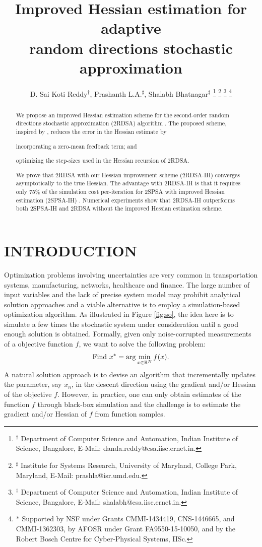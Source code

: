 \documentclass[letterpaper, 10 pt, conference]{ieeeconf}  %
\title{\LARGE \bf
Improved Hessian estimation for adaptive \\random directions stochastic approximation
}
\author{D. Sai Koti Reddy$^\dagger$, Prashanth L.A.$^\sharp$, Shalabh Bhatnagar$^\ddag$
\thanks{
$^\dagger$ Department of Computer Science and Automation,
Indian Institute of Science, Bangalore,
E-Mail: danda.reddy@csa.iisc.ernet.in.}
\thanks{$^\sharp$ Institute for Systems Research, University of Maryland, College Park, Maryland,
E-Mail: prashla@isr.umd.edu.}
\thanks{$^\ddag$ Department of Computer Science and Automation,
Indian Institute of Science, Bangalore,
E-Mail: shalabh@csa.iisc.ernet.in.}
\thanks{$\ast$ Supported by NSF under Grants CMMI-1434419, CNS-1446665,
and CMMI-1362303,  by AFOSR under Grant FA9550-15-10050, and
by the Robert Bosch Centre for Cyber-Physical Systems, IISc.
}
}
\begin{document}
\maketitle
\thispagestyle{empty}
\pagestyle{empty}


\begin{abstract}
We propose an improved Hessian estimation scheme for the second-order random directions stochastic approximation (2RDSA) algorithm \cite{prashanth2015rdsa}. The proposed scheme, inspired by \cite{spall-jacobian}, reduces the error in the Hessian estimate by 
\begin{inparaenum}[\bfseries (i)]
	\item incorporating a zero-mean feedback term; and
	\item optimizing the step-sizes used in the Hessian recursion of 2RDSA.
\end{inparaenum}
We prove that 2RDSA with our Hessian improvement scheme (2RDSA-IH) converges asymptotically to the true Hessian.
The advantage with 2RDSA-IH is that it requires only 75\% of the simulation cost per-iteration for 2SPSA with improved Hessian estimation (2SPSA-IH) \cite{spall-jacobian}.
Numerical experiments show that 2RDSA-IH outperforms both 2SPSA-IH and 2RDSA without the improved Hessian estimation scheme.
\end{abstract}


\section{INTRODUCTION}
Optimization problems involving uncertainties are very common in transportation systems, manufacturing, networks, healthcare and finance. The large number of input variables and the lack of precise system model may prohibit analytical solution approaches and a viable alternative is to employ a simulation-based optimization algorithm. As illustrated in Figure \ref{fig:so}, the idea here is to simulate a few times the stochastic system under consideration until a good enough solution is obtained. Formally, given only noise-corrupted measurements of a objective function $f$, we want to solve the following problem:
\begin{align}
\mbox{Find } x^* = \arg\min_{x \in \mathbb{R}^N} f(x). \label{eq:pb}
\end{align}
A natural solution approach is to devise an algorithm that incrementally updates the parameter, say $x_n$, in the descent direction using the gradient and/or Hessian of the objective $f$. However, in practice, one can only obtain estimates of the function $f$ through black-box simulation and the challenge is to estimate the gradient and/or Hessian of $f$ from function samples. 
\end{document}
